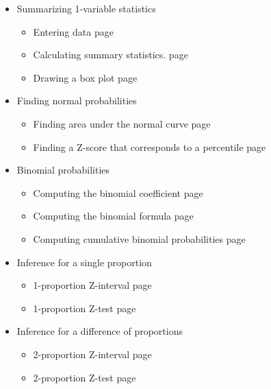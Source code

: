 \begin{itemize}
\item[]  Summarizing 1-variable statistics 

\begin{itemize}\vspace{-1mm}
\setlength{\itemsep}{0mm}
\item[] Entering data \hfill page~\pageref{summarizedata}
\item[] Calculating summary statistics. \hfill page~\pageref{summstat}
\item[] Drawing a box plot \hfill page~\pageref{boxplot}
\end{itemize}

\item[] Finding normal probabilities
\begin{itemize}\vspace{-1mm}
\setlength{\itemsep}{0mm}
\item[] Finding area under the normal curve  \hfill page~\pageref{normal}
\item[] Finding a Z-score that corresponds to a percentile  \hfill page~\pageref{invNorm}
\end{itemize}

\item[] Binomial probabilities
\begin{itemize}\vspace{-1mm}
\setlength{\itemsep}{0mm}
\item[] Computing the binomial coefficient \hfill page~\pageref{calculatorBinomial}
\item[] Computing the binomial formula \hfill page~\pageref{binomialformula}
\item[] Computing cumulative binomial probabilities \hfill page~\pageref{binomialcumulative}
\end{itemize}




\item[]  Inference for a single proportion

\begin{itemize}\vspace{-1mm}
\setlength{\itemsep}{0mm}
\item[] 1-proportion Z-interval \hfill page~\pageref{1PropZInt}
\item[] 1-proportion Z-test \hfill page~\pageref{1propZtest}
\end{itemize}

\item[] Inference for a difference of proportions
\begin{itemize}\vspace{-1mm}
\setlength{\itemsep}{0mm}
\item[] 2-proportion Z-interval \hfill page~\pageref{2propZint}
\item[] 2-proportion Z-test \hfill page~\pageref{2propZtest}
\end{itemize}



\end{itemize}
